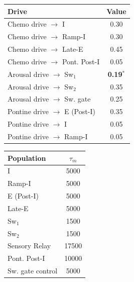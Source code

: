 \documentclass[pdflatex,sn-mathphys-ay]{sn-jnl}%
\theoremstyle{thmstyleone}%
\theoremstyle{thmstyletwo}%
\theoremstyle{thmstylethree}%
\begin{document}
\begin{center}

\begin{tabular}{lc}\hline
Drive & Value\\ \hline
Chemo drive $\to$ I & 0.30\\
Chemo drive $\to$ Ramp-I & 0.30\\
Chemo drive $\to$ Late-E & 0.45\\
Chemo drive $\to$ Pont. Post-I & 0.05\\
Arousal drive $\to$ Sw$_1$ & \textbf{0.19}$^{*}$\\
Arousal drive $\to$ Sw$_2$ & 0.35\\
Arousal drive $\to$ Sw. gate & 0.25\\
Pontine drive $\to$ E (Post-I) & 0.35\\
Pontine drive $\to$ I & 0.05\\
Pontine drive $\to$ Ramp-I & 0.05\\ \hline
\end{tabular}
\footnotesize 
\end{center}
\label{tbl: drives}

\begin{center}
\begin{tabular}{lc}\hline
Population & $\tau_m$ \\ \hline
I & 5000 \\
Ramp-I & 5000 \\
E (Post-I) & 5000 \\
Late-E & 5000 \\
Sw$_1$ & 1500 \\
Sw$_2$ & 1500 \\
Sensory Relay & 17500 \\
Pont. Post-I & 10000 \\
Sw. gate control & 5000 \\ \hline
\end{tabular}
\label{tbl: intrinsic_params}
\end{center}

\end{document}
